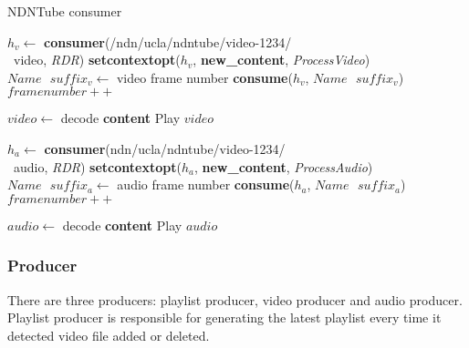 \begin{algorithm}[ht]
\caption{NDNTube consumer}
\label{alg:recordconsumer}
\begin{algorithmic}[4]
\State $h_v \leftarrow $ \textbf{consumer}(/ndn/ucla/ndntube/video-1234/ \\\ video, \textit{RDR})
\State \textbf{setcontextopt}($h_v$, \textbf{new\_content}, \textit{ProcessVideo})
\vspace{0.2cm}
	\State $Name \textbf{ } suffix_v \leftarrow $ video frame number
	\State \textbf{consume}($h_v$, $Name\textbf{ }suffix_v$)
	\State $framenumber ++$
	\EndWhile
\vspace{0.2cm}

   \State $video \leftarrow $ decode \textbf{content}
   \State Play $video$
\EndFunction

\vspace{0.4cm}

\State $h_a \leftarrow $ \textbf{consumer}(ndn/ucla/ndntube/video-1234/ \\\ audio, \textit{RDR})
\State \textbf{setcontextopt}($h_a$, \textbf{new\_content}, \textit{ProcessAudio})
\vspace{0.2cm}
	\State $Name \textbf{ } suffix_a \leftarrow $ audio frame number
	\State \textbf{consume}($h_a$, $Name\textbf{ }suffix_a$)
	\State $framenumber ++$
	\EndWhile
\vspace{0.2cm}

   	\State $audio \leftarrow $ decode \textbf{content}
   	\State Play $audio$
\EndFunction
\end{algorithmic}
\end{algorithm}

\subsubsection{Producer}

There are three producers: playlist producer, video producer and audio producer.
Playlist producer is responsible for generating the latest playlist every time it detected video file added or deleted.

